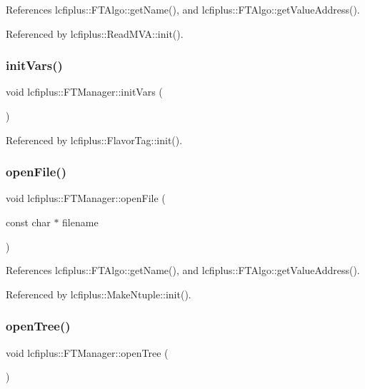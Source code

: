 References lcfiplus\+::\+F\+T\+Algo\+::get\+Name(), and lcfiplus\+::\+F\+T\+Algo\+::get\+Value\+Address().



Referenced by lcfiplus\+::\+Read\+M\+V\+A\+::init().

\mbox{\label{classlcfiplus_1_1FTManager_a8e1c87a7ae3abd38f49d54275659b972}} 
\subsubsection{init\+Vars()}
{\footnotesize\ttfamily void lcfiplus\+::\+F\+T\+Manager\+::init\+Vars (\begin{DoxyParamCaption}{ }\end{DoxyParamCaption})}



Referenced by lcfiplus\+::\+Flavor\+Tag\+::init().

\mbox{\label{classlcfiplus_1_1FTManager_a0bc30c3329fca1fa239d620fd2c5ebc4}} 
\subsubsection{open\+File()}
{\footnotesize\ttfamily void lcfiplus\+::\+F\+T\+Manager\+::open\+File (\begin{DoxyParamCaption}\item[{const char $\ast$}]{filename }\end{DoxyParamCaption})}



References lcfiplus\+::\+F\+T\+Algo\+::get\+Name(), and lcfiplus\+::\+F\+T\+Algo\+::get\+Value\+Address().



Referenced by lcfiplus\+::\+Make\+Ntuple\+::init().

\mbox{\label{classlcfiplus_1_1FTManager_a77588e2cb1437933bfa798f8bf6a2229}} 
\subsubsection{open\+Tree()}
{\footnotesize\ttfamily void lcfiplus\+::\+F\+T\+Manager\+::open\+Tree (\begin{DoxyParamCaption}{ }\end{DoxyParamCaption})}



